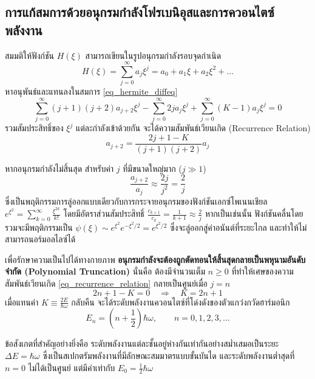\subsection{การแก้สมการด้วยอนุกรมกำลังโฟรเบนิอุสและการควอนไตซ์พลังงาน}
สมมติให้ฟังก์ชัน $H(\xi)$ สามารถเขียนในรูปอนุกรมกำลังรอบจุดกำเนิด
\begin{equation}
H(\xi) = \sum_{j=0}^\infty a_j \xi^j = a_0 + a_1 \xi + a_2 \xi^2 + \dots
\end{equation}
หาอนุพันธ์และแทนลงในสมการ \eqref{eq_hermite_diffeq}
\begin{equation}
\sum_{j=0}^\infty (j + 1)(j + 2) a_{j+2} \xi^j - \sum_{j=0}^\infty 2j a_j \xi^j + \sum_{j=0}^\infty (K - 1) a_j \xi^j = 0
\end{equation}
รวมสัมประสิทธิ์ของ $\xi^j$ แต่ละกำลังเข้าด้วยกัน จะได้ความสัมพันธ์เวียนเกิด (Recurrence Relation)
\begin{equation}
a_{j+2} = \frac{2j + 1 - K}{(j + 1)(j + 2)} a_j \label{eq_recurrence_relation}
\end{equation}

หากอนุกรมกำลังไม่สิ้นสุด สำหรับค่า $j$ ที่มีขนาดใหญ่มาก ($j \gg 1$)
\begin{equation}
\frac{a_{j+2}}{a_j} \approx \frac{2j}{j^2} = \frac{2}{j}
\end{equation}
ซึ่งเป็นพฤติกรรมการลู่ออกแบบเดียวกับการกระจายอนุกรมของฟังก์ชันเอกซ์โพเนนเชียล $e^{\xi^2} = \sum_{k=0}^\infty \frac{\xi^{2k}}{k!}$ โดยมีอัตราส่วนสัมประสิทธิ์ $\frac{c_{k+1}}{c_k} = \frac{1}{k+1} \approx \frac{2}{j}$ หากเป็นเช่นนั้น ฟังก์ชันคลื่นโดยรวมจะมีพฤติกรรมเป็น $\psi(\xi) \sim e^{\xi^2} e^{-\xi^2/2} = e^{\xi^2/2}$ ซึ่งจะลู่ออกสู่ค่าอนันต์ที่ระยะไกล และทำให้ไม่สามารถนอร์มอลไลซ์ได้

เพื่อรักษาความเป็นไปได้ทางกายภาพ \textbf{อนุกรมกำลังจะต้องถูกตัดทอนให้สิ้นสุดกลายเป็นพหุนามอันดับจำกัด (Polynomial Truncation)} นั่นคือ ต้องมีจำนวนเต็ม $n \ge 0$ ที่ทำให้เศษของความสัมพันธ์เวียนเกิด \eqref{eq_recurrence_relation} กลายเป็นศูนย์เมื่อ $j = n$
\begin{equation}
2n + 1 - K = 0 \quad \Longrightarrow \quad K = 2n + 1
\end{equation}
เมื่อแทนค่า $K \equiv \frac{2E}{\hbar\omega}$ กลับคืน จะได้ระดับพลังงานควอนไตซ์ที่โด่งดังของตัวแกว่งกวัดฮาร์มอนิก
\begin{equation}
E_n = \left( n + \frac{1}{2} \right) \hbar\omega, \qquad n = 0, 1, 2, 3, \dots
\end{equation}

ข้อสังเกตที่สำคัญอย่างยิ่งคือ ระดับพลังงานแต่ละชั้นอยู่ห่างกันเท่ากันอย่างสม่ำเสมอเป็นระยะ $\Delta E = \hbar\omega$ ซึ่งเป็นสเปกตรัมพลังงานที่มีลักษณะสมมาตรแบบขั้นบันได และระดับพลังงานต่ำสุดที่ $n = 0$ ไม่ได้เป็นศูนย์ แต่มีค่าเท่ากับ $E_0 = \frac{1}{2}\hbar\omega$

